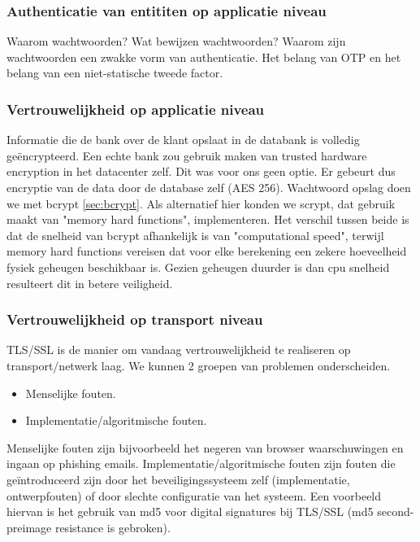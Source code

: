 \documentclass[11pt]{article}
\begin{document}
\subsubsection{Authenticatie van entititen op applicatie niveau}
Waarom wachtwoorden? Wat bewijzen wachtwoorden? Waarom zijn wachtwoorden een zwakke vorm van authenticatie. Het belang van OTP en het belang van een niet-statische tweede factor. \cite{death_of_clever}\cite{pw_habit}

\subsubsection{Vertrouwelijkheid op applicatie niveau}
Informatie die de bank over de klant opslaat in de databank is volledig ge\"encrypteerd. Een echte bank zou gebruik maken van trusted hardware encryption in het datacenter zelf. Dit was voor ons geen optie. Er gebeurt dus encryptie van de data door de database zelf (AES 256). Wachtwoord opslag doen we met bcrypt \cite{bcrypt}\ref{sec:bcrypt}. Als alternatief hier konden we scrypt, dat gebruik maakt van "memory hard functions"\cite{scrypt}, implementeren. Het verschil tussen beide is dat de snelheid van bcrypt afhankelijk is van "computational speed", terwijl memory hard functions vereisen dat voor elke berekening een zekere hoeveelheid fysiek geheugen beschikbaar is. Gezien geheugen duurder is dan cpu snelheid resulteert dit in betere veiligheid.

\subsubsection{Vertrouwelijkheid op transport niveau}
TLS/SSL is de manier om vandaag vertrouwelijkheid te realiseren op transport/netwerk laag. We kunnen 2 groepen van problemen onderscheiden.

\begin{itemize}
\item Menselijke fouten.
\item Implementatie/algoritmische fouten.
\end{itemize}
Menselijke fouten zijn bijvoorbeeld het negeren van browser waarschuwingen en ingaan op phishing emails.
Implementatie/algoritmische fouten zijn fouten die ge\"introduceerd zijn door het beveiligingssysteem zelf (implementatie, ontwerpfouten) of door slechte configuratie van het systeem. Een voorbeeld hiervan is het gebruik van md5 voor digital signatures bij TLS/SSL (md5 second-preimage resistance is gebroken).
\end{document}
